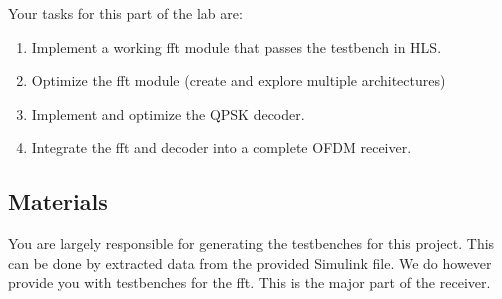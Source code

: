 Your tasks for this part of the lab are: 
\begin{enumerate}
\item Implement a working \gls{fft} module that passes the testbench in HLS.
\item Optimize the \gls{fft} module (create and explore multiple architectures) 
\item Implement and optimize the QPSK decoder.
\item Integrate the \gls{fft} and decoder into a complete OFDM receiver.
\end{enumerate}

\subsection{Materials}

You are largely responsible for generating the testbenches for this project. This can be done by extracted data from the provided Simulink file. We do however provide you with testbenches for the \gls{fft}. This is the major part of the receiver.

